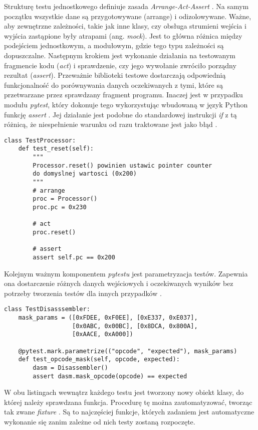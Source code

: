 Strukturę testu jednostkowego definiuje zasada \textit{Arrange-Act-Assert} \cite{WOZNIAK}. Na samym początku wszystkie dane  są przygotowywane (arrange) i odizolowywane. Ważne, aby zewnętrzne zależności, takie jak inne klasy, czy obsługa strumieni wejścia i wyjścia zastąpione były atrapami (ang. \textit{mock}). Jest to główna różnica między podejściem jednostkowym, a modułowym, gdzie tego typu zależności są dopuszczalne. Następnym krokiem jest wykonanie działania na testowanym fragmencie kodu (\textit{act}) i sprawdzenie, czy jego wywołanie zwróciło porządny rezultat (\textit{assert}). Przeważnie biblioteki testowe dostarczają odpowiednią funkcjonalność do porównywania danych oczekiwanych z tymi, które są przetwarzane przez sprawdzany fragment programu. Inaczej jest w przypadku modułu \textit{pytest}, który dokonuje tego wykorzystując wbudowaną w język Python funkcję \textit{assert} \cite{PYTEST}. Jej działanie jest podobne do standardowej instrukcji \textit{if} z tą różnicą, że niespełnienie warunku od razu traktowane jest jako błąd \cite{PYTEST}. 
\begin{lstlisting}[caption={Przykład prostego testu przy użyciu biblioteki \textit{pytest}},captionpos=b]
class TestProcessor:
	def test_reset(self):
		"""
		Processor.reset() powinien ustawic pointer counter
		do domyslnej wartosci (0x200)
		"""
		# arrange
		proc = Processor()
		proc.pc = 0x230
		
		# act
		proc.reset()
		
		# assert
		assert self.pc == 0x200
\end{lstlisting}
Kolejnym ważnym komponentem \textit{pytestu} jest parametryzacja testów. Zapewnia ona dostarczenie różnych danych wejściowych i oczekiwanych wyników bez potrzeby tworzenia testów dla innych przypadków \cite{PYTEST}.
\begin{lstlisting}[caption={Przykład testu sparametryzowanego.},captionpos=b]
class TestDisasssembler:
    mask_params = ([0xFDEE, 0xF0EE], [0xE337, 0xE037],
                   [0x0ABC, 0x00BC], [0x8DCA, 0x800A], 
                   [0xAACE, 0xA000])

    @pytest.mark.parametrize(("opcode", "expected"), mask_params)
    def test_opcode_mask(self, opcode, expected):
        dasm = Disassembler()
        assert dasm.mask_opcode(opcode) == expected
\end{lstlisting}
W obu listingach wewnątrz każdego testu jest tworzony nowy obiekt klasy, do której należy sprawdzana funkcja. Procedurę tę można zautomatyzować, tworząc tak zwane \textit{fixture} \cite{PYTEST}. Są to najczęściej funkcje, których zadaniem jest automatyczne wykonanie się zanim zależne od nich testy zostaną rozpoczęte.

